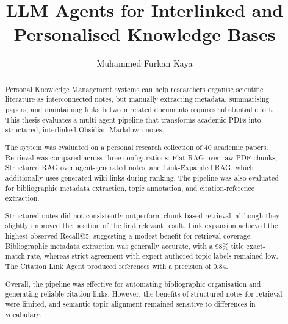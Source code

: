 \documentclass[runningheads]{llncs}
\begin{document}
%
\title{LLM Agents for Interlinked and Personalised Knowledge Bases}
%
%
\author{Muhammed Furkan Kaya}
%
%
%
\maketitle              %
%
\begin{abstract}
Personal Knowledge Management systems can help researchers organise
scientific literature as interconnected notes, but manually extracting
metadata, summarising papers, and maintaining links between related
documents requires substantial effort. This thesis evaluates a
multi-agent pipeline that transforms academic PDFs into structured,
interlinked Obsidian Markdown notes.

The system was evaluated on a personal research collection of 40
academic papers. Retrieval was compared across three configurations:
Flat RAG over raw PDF chunks, Structured RAG over agent-generated notes,
and Link-Expanded RAG, which additionally uses generated wiki-links
during ranking. The pipeline was also evaluated for bibliographic
metadata extraction, topic annotation, and citation-reference
extraction.

Structured notes did not consistently outperform chunk-based
retrieval, although they slightly improved the position of the first
relevant result. Link expansion achieved the highest observed
Recall@5, suggesting a modest benefit for retrieval coverage.
Bibliographic metadata extraction was generally accurate, with a
98\% title exact-match rate, whereas strict agreement with
expert-authored topic labels remained low. The Citation Link Agent
produced references with a precision of 0.84.

Overall, the pipeline was effective for automating bibliographic
organisation and generating reliable citation links. However, the
benefits of structured notes for retrieval were limited, and semantic
topic alignment remained sensitive to differences in vocabulary.


\end{abstract}
%
%
%
\end{document}
